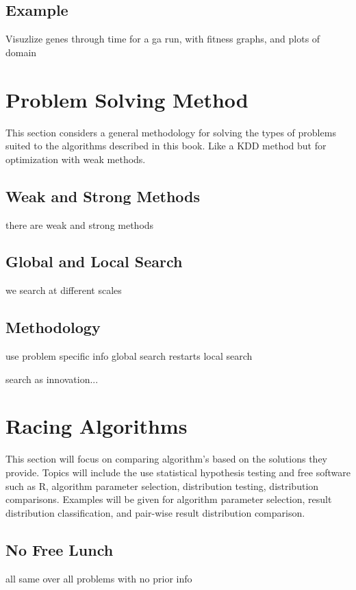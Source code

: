 \begin{bibunit}
\subsection{Example}
Visuzlize genes through time for a ga run, with fitness graphs, and plots of domain


% 
% 
\section{Problem Solving Method}
\label{advanced:sec:method}
This section considers a general methodology for solving the types of problems suited to the algorithms described in this book. Like a KDD method but for optimization with weak methods.

\subsection{Weak and Strong Methods}
there are weak and strong methods

\subsection{Global and Local Search}
we search at different scales

\subsection{Methodology}
use problem specific info
global search
restarts
local search

search as innovation...


% 
% 
\section{Racing Algorithms}
\label{advanced:sec:comparing}
This section will focus on comparing algorithm's based on the solutions they provide. Topics will include the use statistical hypothesis testing and free software such as R, algorithm parameter selection, distribution testing, distribution comparisons. Examples will be given for algorithm parameter selection, result distribution classification, and pair-wise result distribution comparison.

\subsection{No Free Lunch}
all same over all problems with no prior info


\end{bibunit}
